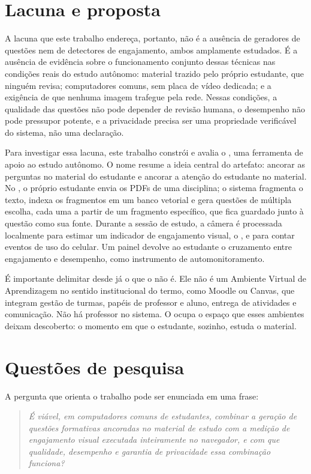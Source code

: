 \section{Lacuna e proposta}

A lacuna que este trabalho endereça, portanto, não é a ausência de geradores de questões nem de detectores de engajamento, ambos amplamente estudados. É a ausência de evidência sobre o funcionamento conjunto dessas técnicas nas condições reais do estudo autônomo: material trazido pelo próprio estudante, que ninguém revisa; computadores comuns, sem placa de vídeo dedicada; e a exigência de que nenhuma imagem trafegue pela rede. Nessas condições, a qualidade das questões não pode depender de revisão humana, o desempenho não pode pressupor  potente, e a privacidade precisa ser uma propriedade verificável do sistema, não uma declaração.

Para investigar essa lacuna, este trabalho constrói e avalia o \ferramenta, uma ferramenta de apoio ao estudo autônomo. O nome resume a ideia central do artefato: ancorar as perguntas no material do estudante e ancorar a atenção do estudante no material. No \ferramenta, o próprio estudante envia os PDFs de uma disciplina; o sistema fragmenta o texto, indexa os fragmentos em um banco vetorial e gera questões de múltipla escolha, cada uma a partir de um fragmento específico, que fica guardado junto à questão como sua fonte. Durante a sessão de estudo, a câmera é processada localmente para estimar um indicador de engajamento visual, o \fs, e para contar eventos de uso do celular. Um painel devolve ao estudante o cruzamento entre engajamento e desempenho, como instrumento de automonitoramento.

É importante delimitar desde já o que o \ferramenta não é. Ele não é um Ambiente Virtual de Aprendizagem no sentido institucional do termo, como Moodle ou Canvas, que integram gestão de turmas, papéis de professor e aluno, entrega de atividades e comunicação. Não há professor no sistema. O \ferramenta ocupa o espaço que esses ambientes deixam descoberto: o momento em que o estudante, sozinho, estuda o material.

\section{Questões de pesquisa}

A pergunta que orienta o trabalho pode ser enunciada em uma frase:

\begin{quote}
\emph{É viável, em computadores comuns de estudantes, combinar a geração de questões formativas ancoradas no material de estudo com a medição de engajamento visual executada inteiramente no navegador, e com que qualidade, desempenho e garantia de privacidade essa combinação funciona?}
\end{quote}

